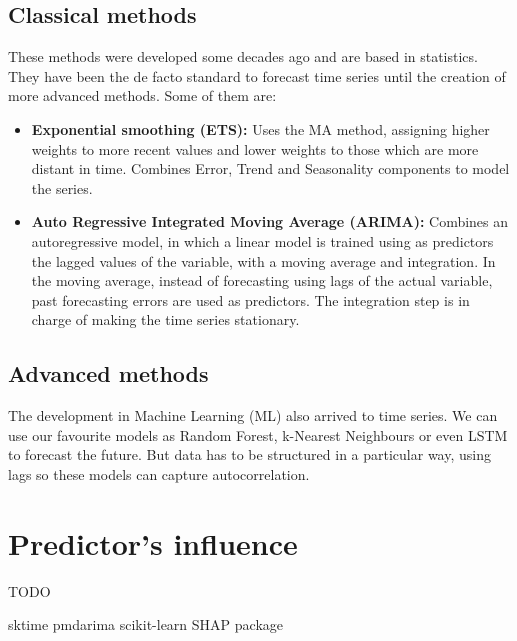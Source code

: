 \subsection{Classical methods}
These methods were developed some decades ago and are based in statistics. They have been the de facto standard to forecast time series until the creation of more advanced methods. Some of them are: \cite{lazzeri2020machine, hyndman2018forecasting}
\begin{itemize}
    \item \textbf{Exponential smoothing (ETS):} Uses the MA method, assigning higher weights to more recent values and lower weights to those which are more distant in time. Combines Error, Trend and Seasonality components to model the series.
    \item \textbf{Auto Regressive Integrated Moving Average (ARIMA):} Combines an autoregressive model, in which a linear model is trained using as predictors the lagged values of the variable, with a moving average and integration. In the moving average, instead of forecasting using lags of the actual variable, past forecasting errors are used as predictors. The integration step is in charge of making the time series stationary.
\end{itemize}

\subsection{Advanced methods}
The development in Machine Learning (ML) also arrived to time series. We can use our favourite models as Random Forest, k-Nearest Neighbours or even LSTM to forecast the future. But data has to be structured in a particular way, using lags so these models can capture autocorrelation.

\section{Predictor's influence}
%
TODO




sktime \cite{DBLP:journals/corr/abs-1909-07872}
pmdarima \cite{pmdarima}
scikit-learn \cite{scikit-learn}
SHAP package \cite{shap-package}
